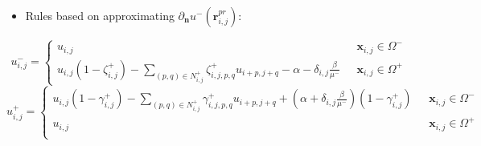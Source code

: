\documentclass{elsarticle}
\begin{document}
\begin{itemize}
	\item Rules based on approximating $\partial_\mathbf{n}u^-(\mathbf{r}^{pr}_{i,j})$:
\end{itemize}
\begin{equation}
	u_{i,j}^-=\begin{cases}
		u_{i,j}                                                                                                                        & \text{ $\mathbf{x}_{i,j}\in \Omega^-$} \\
		u_{i,j} (1-\zeta^+_{i,j}) - \sum_{(p,q)\in N_{i,j}^+} \zeta_{i,j,p,q}^+ u_{i+p,j+q} - \alpha - \delta_{i,j}\frac{\beta}{\mu^-} & \text{ $\mathbf{x}_{i,j}\in \Omega^+$}
	\end{cases}
\end{equation}
\begin{equation}
	u_{i,j}^+=\begin{cases}
		u_{i,j}(1 - \gamma^+_{i,j}) - \sum_{(p,q)\in N^+_{i,j}} \gamma^+_{i,j,p,q} u_{i+p, j+q} + (\alpha + \delta_{i,j}\frac{\beta}{\mu^-})(1 - \gamma^+_{i,j}) & \text{ $\mathbf{x}_{i,j}\in \Omega^-$} \\
		u_{i,j}                                                                                                                                                  & \text{ $\mathbf{x}_{i,j}\in \Omega^+$} \\
	\end{cases}
\end{equation}
\end{document}
